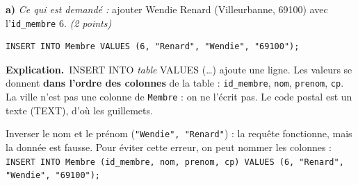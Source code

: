 \documentclass[11pt, a4paper]{exam}
\newcommand{\code}[1]{\texttt{#1}}
\newcommand{\rappel}[1]{\noindent\textit{Ce qui est demandé :} #1\par\smallskip}
\newcommand{\explication}{\noindent\textbf{Explication.}\ }
\newcommand{\sql}[1]{\textsc{#1}}
\begin{document}
\textbf{a)} \rappel{ajouter Wendie Renard (Villeurbanne, 69100) avec l'\code{id\_membre} 6. \hfill\textit{(2 points)}}
\begin{reponse}
\begin{lstlisting}
INSERT INTO Membre VALUES (6, "Renard", "Wendie", "69100");
\end{lstlisting}
\end{reponse}
\explication \sql{INSERT INTO} \textit{table} \sql{VALUES} (\ldots) ajoute une ligne. Les valeurs se donnent \textbf{dans l'ordre des colonnes} de la table : \code{id\_membre}, \code{nom}, \code{prenom}, \code{cp}. La ville n'est pas une colonne de \code{Membre} : on ne l'écrit pas. Le code postal est un texte (TEXT), d'où les guillemets.

\begin{erreur}
Inverser le nom et le prénom (\code{"Wendie", "Renard"}) : la requête fonctionne, mais la donnée est fausse. Pour éviter cette erreur, on peut nommer les colonnes : \code{INSERT INTO Membre (id\_membre, nom, prenom, cp) VALUES (6, "Renard", "Wendie", "69100");}
\end{erreur}
\end{document}
